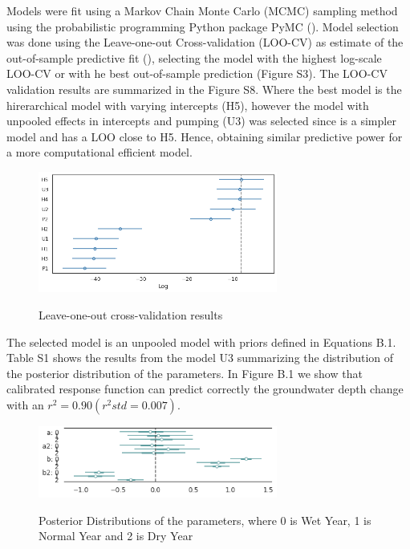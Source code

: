 \documentclass[11pt,a4paper]{article}
\begin{document}
Models were fit using a Markov Chain Monte Carlo (MCMC) sampling method using the probabilistic programming Python package PyMC (\cite{salvatier_probabilistic_2016}). Model selection was done using the Leave-one-out Cross-validation (LOO-CV) as estimate of the out-of-sample predictive fit (\cite{vehtari_practical_2017}), selecting the model with the highest log-scale LOO-CV or with he best out-of-sample prediction (Figure S3). The LOO-CV validation results are summarized in the Figure S8. Where the best model is the hirerarchical model with varying intercepts (H5), however the model with unpooled effects in intercepts and pumping (U3) was selected since is a simpler model and has a LOO close to H5. Hence, obtaining similar predictive power for a more computational efficient model. 

\begin{figure}[H]
\centering
\includegraphics[width=0.7\textwidth]{model_comparison_calibration.png}
\label{fig:mesh1}
\caption{Leave-one-out cross-validation results}
\end{figure}

The selected model is an unpooled model with priors defined in Equations B.1. Table S1 shows the results from the model U3 summarizing the distribution of the posterior distribution of the parameters. In Figure B.1 we show that calibrated response function can predict correctly the groundwater depth change with an $r^2 = 0.90 (r^2 std = 0.007)$. 

\begin{figure}[H]
\centering
\includegraphics[width=0.7\textwidth]{gw_depth_response_posterior_2.png}
\label{fig:mesh1}
\caption{Posterior Distributions of the parameters, where 0 is Wet Year, 1 is Normal Year and 2 is Dry Year}
\end{figure}
\end{document}
